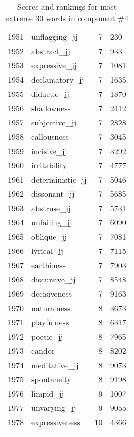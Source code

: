 \begin{longtable}[!htbp]{| rlr@{.}l |}
    1951 & unflagging\_jj & 7 & 230 \\
    1952 & abstract\_jj & 7 & 933 \\
    1953 & expressive\_jj & 7 & 1081 \\
    1954 & declamatory\_jj & 7 & 1635 \\
    1955 & didactic\_jj & 7 & 1870 \\
    1956 & shallowness & 7 & 2412 \\
    1957 & subjective\_jj & 7 & 2828 \\
    1958 & callousness & 7 & 3045 \\
    1959 & incisive\_jj & 7 & 3292 \\
    1960 & irritability & 7 & 4777 \\
    1961 & deterministic\_jj & 7 & 5046 \\
    1962 & dissonant\_jj & 7 & 5685 \\
    1963 & abstruse\_jj & 7 & 5731 \\
    1964 & unfailing\_jj & 7 & 6090 \\
    1965 & oblique\_jj & 7 & 7081 \\
    1966 & lyrical\_jj & 7 & 7115 \\
    1967 & earthiness & 7 & 7903 \\
    1968 & discursive\_jj & 7 & 8548 \\
    1969 & decisiveness & 7 & 9163 \\
    1970 & naturalness & 8 & 3673 \\
    1971 & playfulness & 8 & 6317 \\
    1972 & poetic\_jj & 8 & 7965 \\
    1973 & candor & 8 & 8202 \\
    1974 & meditative\_jj & 8 & 9073 \\
    1975 & spontaneity & 8 & 9198 \\
    1976 & limpid\_jj & 9 & 1007 \\
    1977 & unvarying\_jj & 9 & 9055 \\
    1978 & expressiveness & 10 & 4366 \\
    \hline
    \caption{Scores and rankings for most extreme 30 words in component \#4} \\
\end{longtable}
